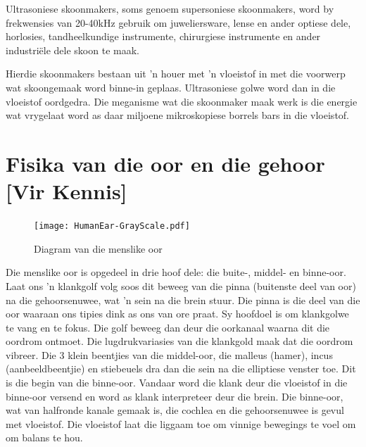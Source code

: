 Ultrasoniese skoonmakers, soms genoem supersoniese skoonmakers, word by frekwensies van 20-40kHz gebruik om juweliersware, lense en ander optiese dele, horlosies, tandheelkundige instrumente, chirurgiese instrumente en ander industri\"ele dele skoon te maak.

Hierdie skoonmakers bestaan uit  'n houer met  'n vloeistof in met die voorwerp wat skoongemaak word binne-in geplaas. Ultrasoniese golwe word dan in die vloeistof oordgedra. Die meganisme wat die skoonmaker maak werk is die energie wat vrygelaat word as daar miljoene mikroskopiese borrels bars in die vloeistof.\par
\label{m38800*notfhsst!!!underscore!!!id482}



\section*{Fisika van die oor en die gehoor [Vir Kennis]}
            \nopagebreak
\begin{figure}[H]
\begin{center}
\texttt{[image: HumanEar-GrayScale.pdf]}
\end{center}
\caption{Diagram van die menslike oor }
\label{Human Ear}
\end{figure}


Die menslike oor is opgedeel in drie hoof dele: die buite-, middel- en binne-oor. Laat ons  'n klankgolf volg soos dit beweeg van die pinna (buitenste deel van oor) na die gehoorsenuwee, wat  'n sein na die brein stuur. Die pinna is die deel van die oor waaraan ons tipies dink as ons van ore praat. Sy hoofdoel is om klankgolwe te vang en te fokus. Die golf beweeg dan deur die oorkanaal waarna dit die oordrom ontmoet. Die lugdrukvariasies van die klankgold maak dat die oordrom vibreer. Die 3 klein beentjies van die middel-oor, die malleus (hamer), incus (aanbeeldbeentjie) en stiebeuels dra dan die sein na die elliptiese venster toe. Dit is die begin van die binne-oor. Vandaar word die klank deur die vloeistof in die binne-oor versend en word as klank interpreteer deur die brein. Die binne-oor, wat van halfronde kanale gemaak is, die cochlea en die gehoorsenuwee is gevul met vloeistof. Die vloeistof laat die liggaam toe om vinnige bewegings te voel om om balans te hou.
\par

